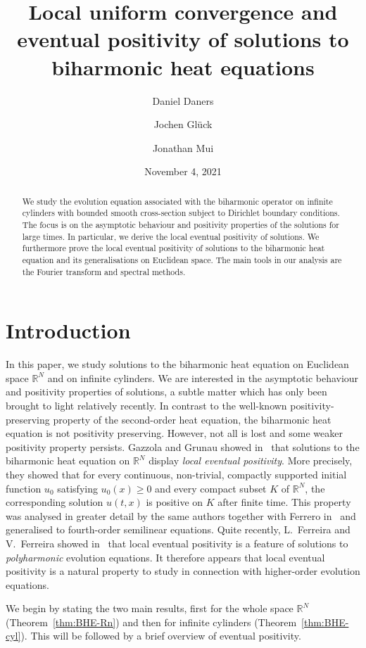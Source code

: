 \documentclass[a4paper, reqno]{amsart}
\title[Local uniform convergence and eventual positivity]{Local uniform convergence and eventual positivity of solutions to biharmonic heat equations}
\author[D. Daners]{Daniel Daners}
\author[J. Gl\"{u}ck]{Jochen Gl\"{u}ck}
\author[J. Mui]{Jonathan Mui}
\date{November 4, 2021}
\numberwithin{equation}{section}
\theoremstyle{plain}
\theoremstyle{definition}
\theoremstyle{remark}
\newcommand{\RR}{\mathbb{R}}
\begin{document}
\begin{abstract}
  We study the evolution equation associated with the biharmonic operator on infinite cylinders with bounded smooth cross-section subject to Dirichlet boundary conditions. The focus is on the asymptotic behaviour and positivity properties of the solutions for large times. In particular, we derive the local eventual positivity of solutions. We furthermore prove the local eventual positivity of solutions to the biharmonic heat equation and its generalisations on Euclidean space. The main tools in our analysis are the Fourier transform and spectral methods.
\end{abstract}

\maketitle

\section{Introduction}

In this paper, we study solutions to the biharmonic heat equation on Euclidean space $\RR^N$ and on infinite cylinders. We are interested in the asymptotic behaviour and positivity properties of solutions, a subtle matter which has only been brought to light relatively recently. In contrast to the well-known positivity-preserving property of the second-order heat equation, the biharmonic heat equation is not positivity preserving. However, not all is lost and some weaker positivity property persists. Gazzola and Grunau showed in~\cite{GG-lep} that solutions to the biharmonic heat equation on $\RR^N$ display \emph{local eventual positivity}. More precisely, they showed that for every continuous, non-trivial, compactly supported initial function $u_0$ satisfying $u_0(x) \geq 0$ and every compact subset $K$ of $\RR^N$, the corresponding solution $u(t,x)$ is positive on $K$ after finite time. This property was analysed in greater detail by the same authors together with Ferrero in~\cite{FGG} and generalised to fourth-order semilinear equations. Quite recently, L.~Ferreira and V.~Ferreira showed in~\cite{FF-lep} that local eventual positivity is a feature of solutions to \emph{polyharmonic} evolution equations. It therefore appears that local eventual positivity is a natural property to study in connection with higher-order evolution equations.

We begin by stating the two main results, first for the whole space $\RR^N$ (Theorem~\ref{thm:BHE-Rn}) and then for infinite cylinders (Theorem~\ref{thm:BHE-cyl}). This will be followed by a brief overview of eventual positivity.
\end{document}
